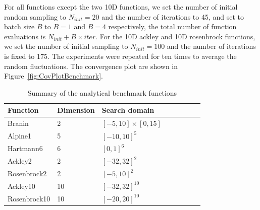 For all functions except the two 10D functions, we set the number of initial random sampling to $N_{init} = 20$ and the number of iterations to 45, and set to batch size $B$ to $B = 1$ and $B=4$ respectively,  the total number of function evaluations is $N_{init} + B \times iter$. For the 10D ackley and 10D rosenbrock functions, we set the number of initial sampling to $N_{init} = 100$ and the number of iterations is fixed to 175. The experiments were repeated for ten times to average the random fluctuations. The convergence plot are shown in Figure~\ref{fig:CovPlotBenchmark}.

\begin{table}[htbp]
    \centering
    \caption{Summary of the analytical benchmark functions}
    \label{tab:summaryanalygical}
    \begin{tabular}{llllllll}
        \toprule
        Function            & Dimension        & Search domain    \\ \midrule
         Branin             & 2                & $[-5,  10]\times[0, 15]$ \\
         Alpine1            & 5                & $[-10, 10]^5$           \\
         Hartmann6          & 6                & $[0,   1]^6$              \\
         Ackley2            & 2                & $[-32, 32]^2$           \\
         Rosenbrock2        & 2                & $[-5,  10]^2$            \\
         Ackley10           & 10               & $[-32, 32]^{10}$          \\
         Rosenbrock10       & 10               & $[-20, 20]^{10}$          \\
        \bottomrule
    \end{tabular}
\end{table}

